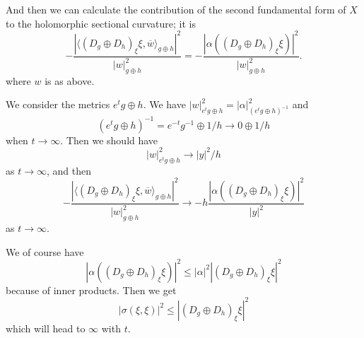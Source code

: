 \documentclass[11pt]{article}
\theoremstyle{definition}
\def\ov#1{\overline{#1}}
\def\<{\langle}
\def\>{\rangle}
\begin{document}
And then we can calculate the contribution of the second fundamental form of $X$
to the holomorphic sectional curvature; it is
$$
-\frac{|\< (D_g \oplus D_h)_\xi \xi, \ov w \>_{g \oplus h}|^2}{|w|^2_{g\oplus h}}
= -\frac{|\alpha((D_g \oplus D_h)_\xi \xi)|^2}{|w|^2_{g\oplus h}}.
$$
where $w$ is as above.

We consider the metrics $e^t g \oplus h$.
We have $|w|^2_{e^tg \oplus h} = |\alpha|^2_{(e^tg \oplus h)^{-1}}$
and
$$
(e^tg \oplus h)^{-1}
= e^{-t} g^{-1} \oplus 1/h
\to 0 \oplus 1/h
$$
when $t \to \infty$.
Then we should have
$$
|w|^2_{e^tg \oplus h}
\to |y|^2/h
$$
as $t \to \infty$, and then
$$
-\frac{|\< (D_g \oplus D_h)_\xi \xi, \ov w \>_{g \oplus h}|^2}{|w|^2_{g\oplus h}}
\to -h\frac{|\alpha((D_g \oplus D_h)_\xi \xi)|^2}{|y|^2}
$$
as $t \to \infty$.

We of course have
$$
|\alpha((D_g \oplus D_h)_\xi \xi)|^2
\leq |\alpha|^2 |(D_g \oplus D_h)_\xi \xi|^2
$$
because of inner products.
Then we get
$$
|\sigma(\xi, \xi)|^2
\leq |(D_g \oplus D_h)_\xi \xi|^2
$$
which will head to $\infty$ with $t$.
\end{document}
